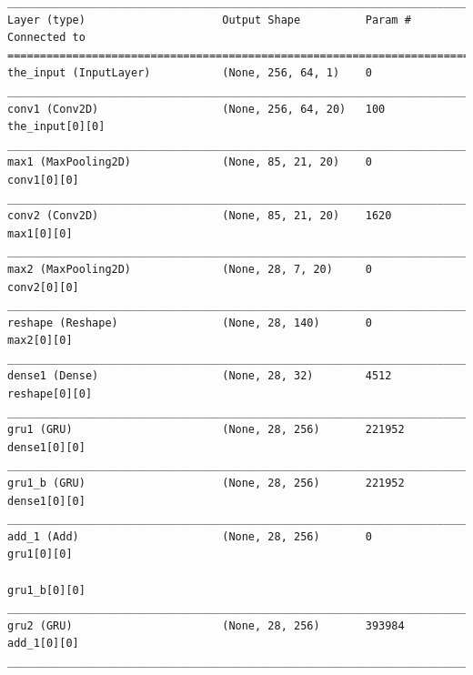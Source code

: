 \documentclass[12pt,fleqn]{article}\usepackage{../../common}
\begin{document}
\begin{verbatim}
____________________________________________________________________________________________________
Layer (type)                     Output Shape          Param #     Connected to                     
====================================================================================================
the_input (InputLayer)           (None, 256, 64, 1)    0                                            
____________________________________________________________________________________________________
conv1 (Conv2D)                   (None, 256, 64, 20)   100         the_input[0][0]                  
____________________________________________________________________________________________________
max1 (MaxPooling2D)              (None, 85, 21, 20)    0           conv1[0][0]                      
____________________________________________________________________________________________________
conv2 (Conv2D)                   (None, 85, 21, 20)    1620        max1[0][0]                       
____________________________________________________________________________________________________
max2 (MaxPooling2D)              (None, 28, 7, 20)     0           conv2[0][0]                      
____________________________________________________________________________________________________
reshape (Reshape)                (None, 28, 140)       0           max2[0][0]                       
____________________________________________________________________________________________________
dense1 (Dense)                   (None, 28, 32)        4512        reshape[0][0]                    
____________________________________________________________________________________________________
gru1 (GRU)                       (None, 28, 256)       221952      dense1[0][0]                     
____________________________________________________________________________________________________
gru1_b (GRU)                     (None, 28, 256)       221952      dense1[0][0]                     
____________________________________________________________________________________________________
add_1 (Add)                      (None, 28, 256)       0           gru1[0][0]                       
                                                                   gru1_b[0][0]                     
____________________________________________________________________________________________________
gru2 (GRU)                       (None, 28, 256)       393984      add_1[0][0]                      
____________________________________________________________________________________________________

\end{verbatim}
\end{document}
